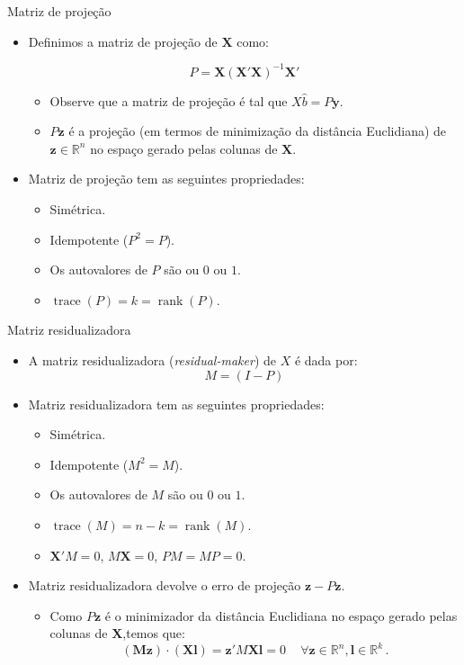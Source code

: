 \documentclass[11pt]{beamer}
\begin{document}
\begin{frame}{Matriz de projeção}
\begin{itemize}
	\item Definimos a matriz de projeção de $\boldsymbol{X}$ como:
	
	$$P = \boldsymbol{X}(\boldsymbol{X}'\boldsymbol{X})^{-1}\boldsymbol{X}'$$
	\begin{itemize}
		\item Observe que a matriz de projeção é tal que $X\hat{b} = P\boldsymbol{y}$.
		\item $P\boldsymbol{z}$ é a projeção (em termos de minimização da distância Euclidiana) de $\boldsymbol{z} \in \mathbb{R}^n$ no espaço gerado pelas colunas de $\boldsymbol{X}$.
	\end{itemize}
	\item Matriz de projeção tem as seguintes propriedades:
	\begin{itemize}
		\item Simétrica.
		\item Idempotente ($P^2=P$).
		\item Os autovalores de $P$ são ou $0$ ou $1$.
		\item $\operatorname{trace}(P) = k = \operatorname{rank}(P)$.
	\end{itemize}
\end{itemize}
\end{frame}
\begin{frame}{Matriz residualizadora}
	\begin{itemize}
		\item A matriz residualizadora (\textit{residual-maker}) de $X$ é dada por:
		$$M = (I-P)$$

		\item Matriz residualizadora tem as seguintes propriedades:
		\begin{itemize}
		\item Simétrica.
		\item Idempotente ($M^2=M$).
		\item Os autovalores de $M$ são ou $0$ ou $1$.
		\item $\operatorname{trace}(M) = n-k = \operatorname{rank}(M)$.
		\item $\boldsymbol{X}'M  = 0 $, $M\boldsymbol{X}=0$, $PM=MP=0$.
	\end{itemize}
	\item Matriz residualizadora devolve o erro de projeção $\boldsymbol{z} - {P}\boldsymbol{z}$.
	\begin{itemize}
		\item Como ${P}\boldsymbol{z}$ é o minimizador da distância Euclidiana no espaço gerado pelas colunas de $\boldsymbol{X}$,temos que: $$(\boldsymbol{M}\boldsymbol{z})\cdot(\boldsymbol{X}\boldsymbol{l}) = \boldsymbol{z}'M\boldsymbol{X}\boldsymbol{l} = 0\,\quad \forall \boldsymbol{z}\in \mathbb{R}^n, \boldsymbol{l} \in \mathbb{R}^k \, .$$
	\end{itemize}
\end{itemize}
\end{frame}
\end{document}
